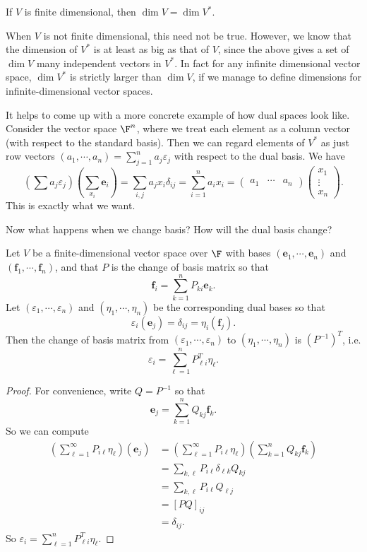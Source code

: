 \documentclass[a4paper]{article}
\begin{document}
\begin{cor}
  If $V$ is finite dimensional, then $\dim V = \dim V^*$.
\end{cor}
When $V$ is not finite dimensional, this need not be true. However, we know that the dimension of $V^*$ is at least as big as that of $V$, since the above gives a set of $\dim V$ many independent vectors in $V^*$. In fact for any infinite dimensional vector space, $\dim V^*$ is strictly larger than $\dim V$, if we manage to define dimensions for infinite-dimensional vector spaces.

It helps to come up with a more concrete example of how dual spaces look like. Consider the vector space $\F^n$, where we treat each element as a column vector (with respect to the standard basis). Then we can regard elements of $V^*$ as just row vectors $(a_1, \cdots, a_n) = \sum_{j = 1}^n a_j\varepsilon_j$ with respect to the dual basis. We have
\[
  \left(\sum a_j \varepsilon_j\right)\left(\sum_{x_i}\mathbf{e}_i\right) = \sum_{i, j} a_j x_i \delta_{ij} = \sum_{i = 1}^n a_i x_i =
  \begin{pmatrix}
    a_1 & \cdots & a_n
  \end{pmatrix}
  \begin{pmatrix}
    x_1\\\vdots\\x_n
  \end{pmatrix}.
\]
This is exactly what we want.

Now what happens when we change basis? How will the dual basis change?
\begin{prop}
  Let $V$ be a finite-dimensional vector space over $\F$ with bases $(\mathbf{e}_1, \cdots, \mathbf{e}_n)$ and $(\mathbf{f}_1, \cdots, \mathbf{f}_n)$, and that $P$ is the change of basis matrix so that
  \[
    \mathbf{f}_i = \sum_{k = 1}^n P_{ki}\mathbf{e}_k.
  \]
  Let $(\varepsilon_1, \cdots, \varepsilon_n)$ and $(\eta_1, \cdots, \eta_n)$ be the corresponding dual bases so that
  \[
    \varepsilon_i (\mathbf{e}_j) = \delta_{ij} = \eta_i (\mathbf{f}_j).
  \]
  Then the change of basis matrix from $(\varepsilon_1, \cdots, \varepsilon_n)$ to $(\eta_1, \cdots, \eta_n)$ is $(P^{-1})^T$, i.e.
  \[
    \varepsilon_i = \sum_{\ell = 1}^n P_{\ell i}^T \eta_\ell.
  \]
\end{prop}

\begin{proof}
  For convenience, write $Q = P^{-1}$ so that
  \[
    \mathbf{e}_j = \sum_{k = 1}^n Q_{kj}\mathbf{f}_k.
  \]
  So we can compute
  \begin{align*}
    \left(\sum_{\ell = 1}^\infty P_{i\ell}\eta_\ell\right)(\mathbf{e}_j) &= \left(\sum_{\ell = 1}^\infty P_{i\ell}\eta_\ell\right)\left(\sum_{k = 1}^n Q_{kj}\mathbf{f}_k\right)\\
    &= \sum_{k, \ell} P_{i\ell}\delta_{\ell k} Q_{kj}\\
    &= \sum_{k, \ell} P_{i\ell} Q_{\ell j}\\
    &= [PQ]_{ij}\\
    &= \delta_{ij}.
  \end{align*}
  So $\varepsilon_i = \sum_{\ell = 1}^n P_{\ell i}^T \eta_\ell$.
\end{proof}
\end{document}
